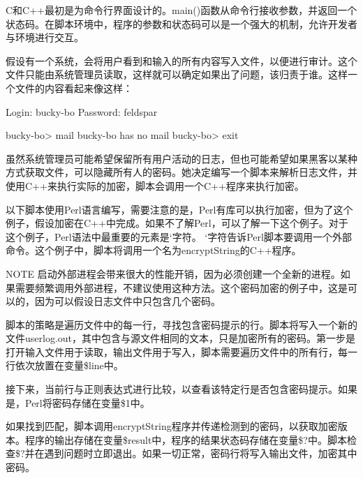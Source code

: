 C和C++最初是为命令行界面设计的。main()函数从命令行接收参数，并返回一个状态码。在脚本环境中，程序的参数和状态码可以是一个强大的机制，允许开发者与环境进行交互。


假设有一个系统，会将用户看到和输入的所有内容写入文件，以便进行审计。这个文件只能由系统管理员读取，这样就可以确定如果出了问题，该归责于谁。这样一个文件的内容看起来像这样：

\begin{shell}
Login: bucky-bo
Password: feldspar

bucky-bo> mail
bucky-bo has no mail
bucky-bo> exit
\end{shell}

虽然系统管理员可能希望保留所有用户活动的日志，但也可能希望如果黑客以某种方式获取文件，可以隐藏所有人的密码。她决定编写一个脚本来解析日志文件，并使用C++来执行实际的加密，脚本会调用一个C++程序来执行加密。

以下脚本使用Perl语言编写，需要注意的是，Perl有库可以执行加密，但为了这个例子，假设加密在C++中完成。如果不了解Perl，可以了解一下这个例子。对于这个例子，Perl语法中最重要的元素是`字符。 `字符告诉Perl脚本要调用一个外部命令。这个例子中，脚本将调用一个名为encryptString的C++程序。

\begin{myNotic}{NOTE}
启动外部进程会带来很大的性能开销，因为必须创建一个全新的进程。如果需要频繁调用外部进程，不建议使用这种方法。这个密码加密的例子中，这是可以的，因为可以假设日志文件中只包含几个密码。
\end{myNotic}

脚本的策略是遍历文件中的每一行，寻找包含密码提示的行。脚本将写入一个新的文件userlog.out，其中包含与源文件相同的文本，只是加密所有的密码。第一步是打开输入文件用于读取，输出文件用于写入，脚本需要遍历文件中的所有行，每一行依次放置在变量\$line中。

\begin{shell}
open (INPUT, "userlog.txt") or die "Couldn't open input file!";
open (OUTPUT, ">userlog.out") or die "Couldn't open output file!";
while ($line = <INPUT>) {
\end{shell}

接下来，当前行与正则表达式进行比较，以查看该特定行是否包含密码提示。如果是，Perl将密码存储在变量\$1中。

\begin{shell}
    if ($line =˜ m/^Password: (.*)/) {
\end{shell}

如果找到匹配，脚本调用encryptString程序并传递检测到的密码，以获取加密版本。程序的输出存储在变量\$result中，程序的结果状态码存储在变量\$?中。脚本检查\$?并在遇到问题时立即退出。如果一切正常，密码行将写入输出文件，加密其中密码。

